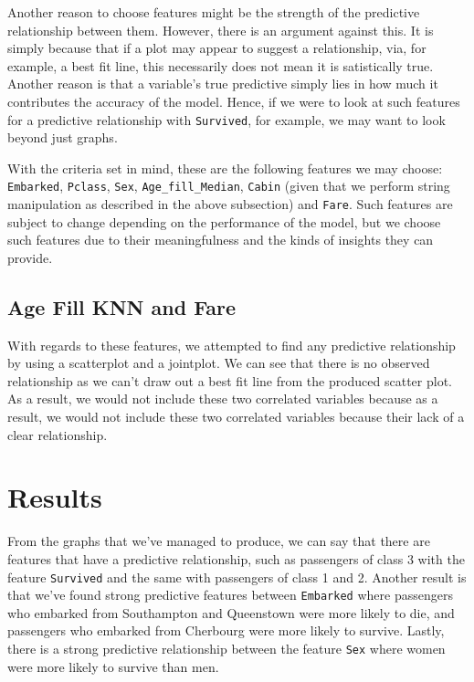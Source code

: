 \documentclass[a4paper, twocolumn]{article}
\begin{document}
Another reason to choose features might be the strength of the predictive relationship between them. However, there
is an argument against this. It is simply because that if a plot may appear to suggest a relationship, via, for
example, a best fit line, this necessarily does not mean it is satistically true. Another reason is that a variable's
true predictive simply lies in how much it contributes the accuracy of the model. Hence, if we were to look at such
features for a predictive relationship with \texttt{Survived}, for example, we may want to look beyond just graphs.

With the criteria set in mind, these are the following features we may choose: \texttt{Embarked}, \texttt{Pclass},
\texttt{Sex}, \texttt{Age\_fill\_Median}, \texttt{Cabin} (given that we perform string manipulation as described
in the above subsection) and \texttt{Fare}. Such features are subject to change depending on the performance of 
the model, but we choose such features due to their meaningfulness and the kinds of insights they can provide. 

\subsection{Age Fill KNN and Fare}
With regards to these features, we attempted to find any predictive relationship by using a scatterplot and a
jointplot. We can see that there is no observed relationship as we can't draw out a best fit line from the produced
scatter plot. As a result, we would not include these two correlated variables because as a result, we would not
 include these two correlated variables because their lack of a clear relationship.


\section{Results}
From the graphs that we've managed to produce, we can say that there are features that have a predictive relationship,
such as passengers of class 3 with the feature \texttt{Survived} and the same with passengers of class 1 and 2. Another
result is that we've found strong predictive features between \texttt{Embarked} where passengers who embarked from
Southampton and Queenstown were more likely to die, and passengers who embarked from Cherbourg were more likely to
survive. Lastly, there is a strong predictive relationship between the feature \texttt{Sex} where women were more 
likely to survive than men.
\end{document}
